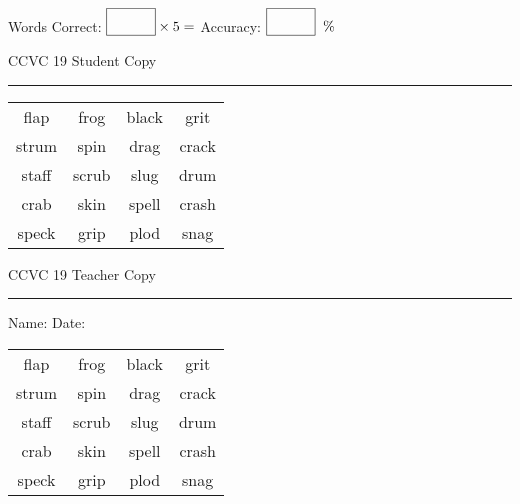 \documentclass{memoir}
\begin{document}
\small

Words Correct: $\fbox{\phantom{\huge 100}} \times 5 = $ Accuracy: $\fbox{\phantom{\huge 100}}\;\; \%$ 

\vfill

\newpage


\footnotesize \noindent
CCVC 19 \hfill Student Copy
\smallskip
\hrule

\Large

\setlength{\tabcolsep}{14pt}
\def\arraystretch{3}

{\selectfont


\begin{vplace}[0.5]
\begin{center}
\begin{tabular}{cccc}
flap            & frog & black            & grit      \\
strum & spin & drag        & crack       \\
staff            & scrub & slug & drum \\
crab        & skin & spell & crash \\
speck & grip      & plod & snag \\
\end{tabular}
\end{center}
\end{vplace}

}

\newpage

\footnotesize \noindent
CCVC 19 \hfill Teacher Copy
\smallskip
\hrule

\small

\vfill

\noindent
Name: \underline{\hspace{1.75in}} \hfill Date: \underline{\hspace{1in}}

\Large

{\selectfont


\begin{vplace}[0.5]
\begin{center}
\begin{tabular}{cccc}
flap            & frog & black            & grit      \\
strum & spin & drag        & crack       \\
staff            & scrub & slug & drum \\
crab        & skin & spell & crash \\
speck & grip      & plod & snag \\
\end{tabular}
\end{center}
\end{vplace}



}
\end{document}
